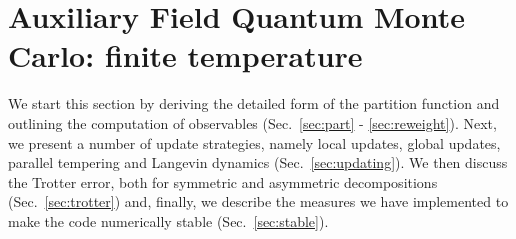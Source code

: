 

\section{Auxiliary Field Quantum Monte Carlo: finite temperature}\label{sec:def}



We start this section by deriving the detailed form of the partition function and outlining the computation of observables (Sec.~\ref{sec:part} - \ref{sec:reweight}). 
Next, we present a number of update strategies, namely local updates, global updates,  parallel tempering  and Langevin dynamics  (Sec.~\ref{sec:updating}). 
We then discuss the Trotter error, both for symmetric and asymmetric decompositions (Sec.~\ref{sec:trotter}) and, finally, we describe the measures we have implemented to make the code numerically stable (Sec.~\ref{sec:stable}).

